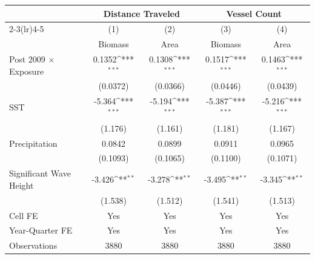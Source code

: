 \def\sym#1{\ifmmode^{#1}\else\(^{#1}\)\fi}
\begin{tabular}{l*{4}{c}}
\hline\hline
                    &\multicolumn{2}{c}{Distance Traveled}&\multicolumn{2}{c}{Vessel Count}\\
                    \cmidrule(lr){2-3}\cmidrule(lr){4-5}
                    &\multicolumn{1}{c}{(1)}&\multicolumn{1}{c}{(2)}&\multicolumn{1}{c}{(3)}&\multicolumn{1}{c}{(4)}\\
                    &\multicolumn{1}{c}{Biomass}&\multicolumn{1}{c}{Area}&\multicolumn{1}{c}{Biomass}&\multicolumn{1}{c}{Area}\\
\hline
Post 2009 $\times$ Exposure&     0.1352\sym{***}&     0.1308\sym{***}&     0.1517\sym{***}&     0.1463\sym{***}\\
                    &             (0.0372)&             (0.0366)&             (0.0446)&             (0.0439)\\
[1em]
SST                 &     -5.364\sym{***}&     -5.194\sym{***}&     -5.387\sym{***}&     -5.216\sym{***}\\
                    &              (1.176)&              (1.161)&              (1.181)&              (1.167)\\
[1em]
Precipitation       &     0.0842&     0.0899&     0.0911&     0.0965\\
                    &             (0.1093)&             (0.1065)&             (0.1100)&             (0.1071)\\
[1em]
Significant Wave Height&     -3.426\sym{**}&     -3.278\sym{**}&     -3.495\sym{**}&     -3.345\sym{**}\\
                    &              (1.538)&              (1.512)&              (1.541)&              (1.513)\\
[1em]
\hline
Cell FE             &         Yes         &         Yes         &         Yes         &         Yes         \\
Year-Quarter FE     &         Yes         &         Yes         &         Yes         &         Yes         \\
Observations        &        3880         &        3880         &        3880         &        3880         \\
\hline\hline
\end{tabular}
